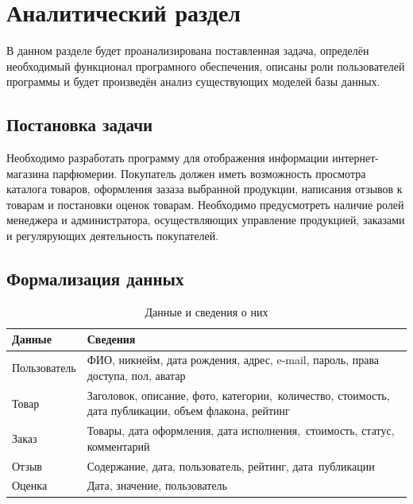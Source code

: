 \chapter{Аналитический раздел}
В данном разделе будет проанализирована поставленная задача, определён необходимый функционал програмного обеспечения, описаны роли пользователей программы и будет произведён анализ существующих моделей базы данных.

\section{Постановка задачи}
Необходимо разработать программу для отображения информации \newline интернет-магазина парфюмерии. Покупатель должен иметь возможность просмотра каталога товаров, оформления зазаза выбранной продукции, написания отзывов к товарам и постановки оценок товарам. Необходимо предусмотреть наличие ролей менеджера и администратора, осуществляющих управление продукцией, заказами и регулярующих деятельность покупателей.
\section{Формализация данных}

\captionsetup{singlelinecheck = false, justification=raggedright}
\begin{table}[h!]
	\begin{center}
		\caption{Данные и сведения о них}
		\begin{tabular}{ |p{5cm}|p{11cm}| }
			\hline
			\textbf{Данные} & \textbf{Сведения}\\ \hline
			Пользователь &  ФИО, никнейм, дата рождения, адрес, e-mail, пароль, права доступа, пол, аватар\\ \hline
			Товар &  Заголовок, описание, фото, категории,\ количество, стоимость, дата публикации, объем флакона, рейтинг\\ \hline
			Заказ &  Товары, дата оформления, дата исполнения,\ стоимость, статус, комментарий\\ \hline
			Отзыв &  Содержание, дата, пользователь, рейтинг, дата\ публикации\\ \hline
			Оценка &  Дата, значение, пользователь\\ \hline
		\end{tabular}
		\label{data-table}
	\end{center}
\end{table}		

\newpage

